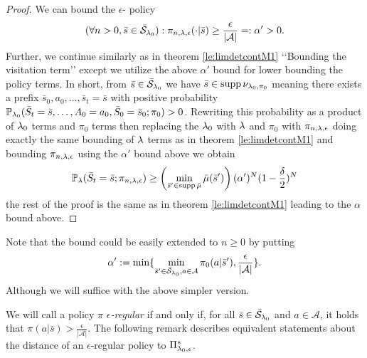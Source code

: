 \begin{proof}
We can bound the $\epsilon$-\eUDRL{} policy
$$
(\forall n >0, \bar{s} \in \bar{\mathcal{S}}_{\mathit{\lambda}_0}):
\pi_{n,\mathit{\lambda},\epsilon}(\cdot|\bar{s}) \geq \frac{\epsilon}{|\mathcal{A}|} =: \alpha' >0.
$$
Further, we continue similarly as in theorem \ref{le:limdetcontM1} \lq\lq{}Bounding the visitation term\rq\rq{} except we utilize the
above $\alpha'$ bound for lower bounding the policy terms.
In short, from $\bar{s}\in\bar{\mathcal{S}}_{\mathit{\lambda}_0}$ we have $\bar{s}\in \operatorname*{\mathrm{supp}} \nu_{\mathit{\lambda}_0,\pi_0}$ meaning there exists a prefix
$\bar{s}_0,a_0,\ldots,\bar{s}_t = \bar{s}$ with positive probability
$\mathbb{P}_{\mathit{\lambda}_0}(\bar{S}_t=\bar{s},\ldots,A_0 = a_0,\bar{S}_0=\bar{s}_0;\pi_0)>0$.
Rewriting this probability as a product of $\mathit{\lambda}_0$ terms and $\pi_0$ terms
then replacing the $\mathit{\lambda}_0$ with $\mathit{\lambda}$ and $\pi_0$
with $\pi_{n,\mathit{\lambda},\epsilon}$ doing exactly the same bounding of $\mathit{\lambda}$
terms as in theorem \ref{le:limdetcontM1} and bounding $\pi_{n,\mathit{\lambda},\epsilon}$ using the $\alpha'$ bound above we obtain
$$
\mathbb{P}_{\mathit{\lambda}}(\bar{S}_t=\bar{s};\pi_{n,\mathit{\lambda},\epsilon})
\geq
\left(\min_{\bar{s}'\in \operatorname*{\mathrm{supp}}\bar{\mu}} \bar{\mu}(\bar{s}')\right)
(\alpha')^N
(1-\frac{\delta}{2})^N
$$
the rest of the proof is the same as in theorem \ref{le:limdetcontM1}
leading to the $\alpha$ bound above.
\end{proof}
Note that the bound could be easily extended to $n\geq 0$ by putting
$$
\alpha':= \min\{ \min_{\bar{s}'\in \bar{\mathcal{S}}_{\mathit{\lambda}_0}, a \in \mathcal{A}} \pi_0(a|\bar{s}'), \frac{\epsilon}{|\mathcal{A}|} \}.
$$
Although we will suffice with the above simpler version.

We will call a policy $\pi$ \emph{$\epsilon$-regular}
if and only if, for all $\bar{s} \in \bar{\mathcal{S}}_{\mathit{\lambda}_0}$ and $a \in \mathcal{A}$, it holds that $\pi(a|\bar{s}) > \frac{\epsilon}{|\mathcal{A}|}$.
The following remark describes equivalent statements about the distance of an $\epsilon$-regular policy to $\Pi_{\mathit{\lambda}_0,\epsilon}^*$.

